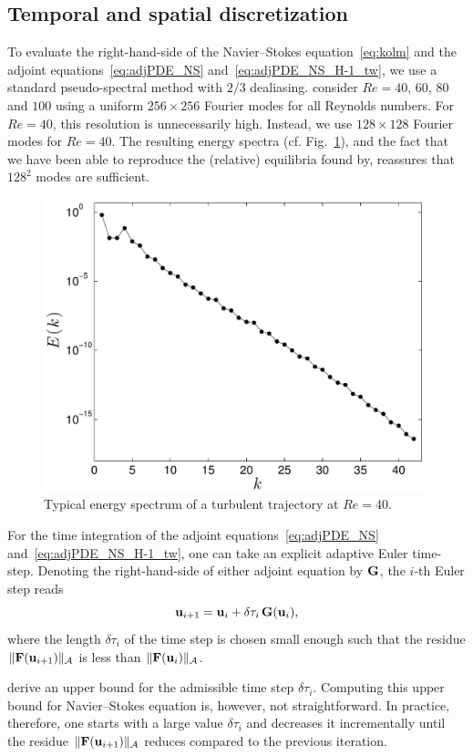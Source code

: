 \documentclass{jfm}
\begin{document}
\subsection{Temporal and spatial discretization}
To evaluate the right-hand-side of the Navier--Stokes equation~\eqref{eq:kolm} and the adjoint
equations~\eqref{eq:adjPDE_NS} and~\eqref{eq:adjPDE_NS_H-1_tw}, we use a standard pseudo-spectral
method with $2/3$ dealiasing. \cite{CK13} consider $Re=40$, $60$, $80$ and $100$ using a uniform
$256\times 256$ Fourier modes for all Reynolds numbers. For $Re=40$, this resolution is
unnecessarily high. Instead, we use $128\times 128$ Fourier modes for $Re=40$.
The resulting energy spectra (cf. Fig.~\ref{fig:Ek}), and the fact that we have been
able to reproduce the (relative) equilibria found by, reassures that $128^2$ modes are
sufficient.
%
\begin{figure}
\centering
\includegraphics[width=.65\textwidth]{Espec}
\caption{Typical energy spectrum of a turbulent trajectory at $Re=40$.}
\label{fig:Ek}
\end{figure}

For the time integration of the adjoint equations~\eqref{eq:adjPDE_NS}
and~\eqref{eq:adjPDE_NS_H-1_tw},
one can take an explicit adaptive Euler time-step. Denoting the right-hand-side of either adjoint
equation by $\mathbf G$, the $i$-th Euler step reads
$$\mathbf u_{i+1}=\mathbf u_i+\delta\tau_i\,\mathbf G(\mathbf u_i),$$
where the length $\delta\tau_i$ of the time step is chosen small enough such that the residue
$\|\mathbf F(\mathbf u_{i+1})\|_{\mathcal A}$ is less than $\|\mathbf F(\mathbf u_{i})\|_{\mathcal A}$.

\cite{yang07} derive an upper bound for the admissible time step $\delta\tau_i$.
Computing this upper bound for Navier--Stokes equation is, however, not straightforward.
In practice, therefore, one starts with a large value $\delta\tau_i$ and decreases it incrementally
until the residue $\|\mathbf F(\mathbf u_{i+1})\|_{\mathcal A}$ reduces compared to the previous iteration.
\end{document}
